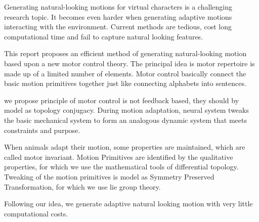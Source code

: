 


\begin{abstracts}        %

Generating natural-looking motions for virtual characters is a challenging research topic.
It becomes even harder when generating adaptive motions interacting with the environment. 
Current methods are tedious, cost long computational time and fail to capture natural looking features.

This report proposes an efficient method of generating natural-looking motion based upon a new motor control theory.
The principal idea is motor repertoire is made up of a limited number of elements. Motor control basically connect the basic motion primitives together just like connecting alphabets into sentences.

we propose principle of motor control is not feedback based, they should by model as topology conjugacy.
During motion adaptation, neural system tweaks the basic mechanical system to form an analogous dynamic system that meets constraints and purpose.

When animals adapt their motion, some properties are maintained, which are called motor invariant.
Motion Primitives are identified by the qualitative properties, for which we use the mathematical tools of differential topology.
Tweaking of the motion primitives is model as Symmetry Preserved Transformation, for which we use lie group theory.



Following our idea, we generate adaptive natural looking motion with very little computational costs.
\end{abstracts}





